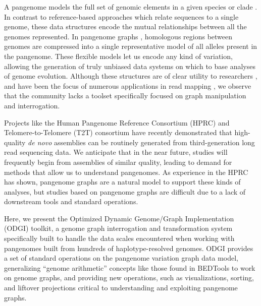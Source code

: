 \documentclass{bioinfo}
\begin{document}
A pangenome models the full set of genomic elements in a given species or clade \citep{cpang2018,Eizenga_2020}.
In contrast to reference-based approaches which relate sequences to a single genome, these data structures encode the mutual relationships between all the genomes represented.
In pangenome graphs \citep{Paten:2017}, homologous regions between genomes are compressed into a single representative model of all alleles present in the pangenome.
These flexible models let us encode any kind of variation, allowing the generation of truly unbiased data systems on which to base analyses of genome evolution.
Although these structures are of clear utility to researchers \citep{cpang2018}, and have been the focus of numerous applications in read mapping \citep{Garrison:2018,Baaijens_2019,Hickey:2020,Sibbesen_2021}, we observe that the community lacks a toolset specifically focused on graph manipulation and interrogation.

Projects like the Human Pangenome Reference Consortium (HPRC) and Telomere-to-Telomere (T2T) consortium \citep{Miga:2020, Logsdon_2021, Nurk_2021} have recently demonstrated that high-quality \textit{de novo} assemblies can be routinely generated from third-generation long read sequencing data.
We anticipate that in the near future, studies will frequently begin from assemblies of similar quality, leading to demand for methods that allow us to understand pangenomes.
As experience in the HPRC has shown, pangenome graphs are a natural model to support these kinds of analyses, but studies based on pangenome graphs are difficult due to a lack of downstream tools and standard operations.

Here, we present the Optimized Dynamic Genome/Graph Implementation (ODGI) toolkit, a genome graph interrogation and transformation system specifically built to handle the data scales encountered when working with pangenomes built from hundreds of haplotype-resolved genomes.
ODGI provides a set of standard operations on the pangenome variation graph data model, generalizing ``genome arithmetic'' concepts like those found in BEDTools \citep{Quinlan_2010} to work on genome graphs, and providing new operations, such as visualizations, sorting, and liftover projections critical to understanding and exploiting pangenome graphs.
\end{document}
